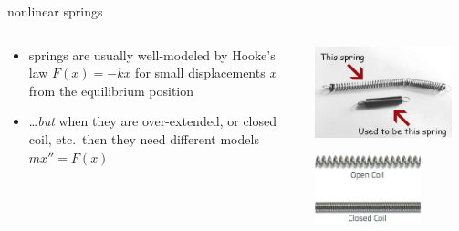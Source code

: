 \documentclass[dvipsnames,colorlinks]{beamer}
\begin{document}
\begin{frame}{nonlinear springs}

\begin{columns}
\begin{column}{0.65\textwidth}
\begin{itemize}
\item springs are usually well-modeled by Hooke's law $F(x)=-kx$ for small displacements $x$ from the equilibrium position
\item \dots \emph{but} when they are over-extended, or closed coil, etc.~then they need different models $mx''=F(x)$
\end{itemize}
\end{column}
\begin{column}{0.35\textwidth}
\includegraphics[width=0.9\textwidth]{figs/spring-failure}

\vspace{3mm}

\includegraphics[width=0.7\textwidth]{figs/open-closed-spring}
\end{column}
\end{columns}

\bigskip


\end{frame}
\end{document}
